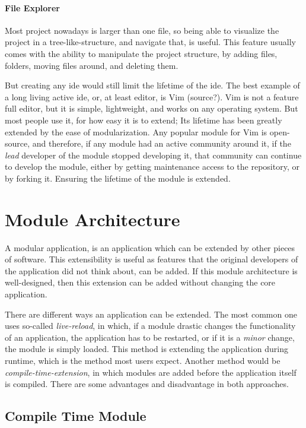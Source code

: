 \paragraph{File Explorer} Most project nowadays is larger than one file, so
being able to visualize the project in a tree-like-structure, and navigate that,
is useful. This feature usually comes with the ability to manipulate the project
structure, by adding files, folders, moving files around, and deleting them.

But creating any \gls{ide} would still limit the lifetime of the \gls{ide}.
The best example of a long living active \gls{ide}, or, at least editor, is Vim
(source?). Vim is not a feature full editor, but it is simple, lightweight, and
works on any operating system. But most people use it, for how easy it is to
extend; Its lifetime has been greatly extended by the ease of modularization.
Any popular module for Vim is open-source, and therefore, if any module had an
active community around it, if the \textit{lead} developer of the module stopped
developing it, that community can continue to develop the module, either by
getting maintenance access to the repository, or by forking it. Ensuring the
lifetime of the module is extended.

\section{Module Architecture}


A modular application, is an application which can be extended by other pieces
of software. This extensibility is useful as features that the original
developers of the application did not think about, can be added. If this module
architecture is well-designed, then this extension can be added without changing
the core application.

There are different ways an application can be extended. The most common one
uses so-called \textit{live-reload}, in which, if a module drastic changes the
functionality of an application, the application has to be restarted, or if it
is a \textit{minor} change, the module is simply loaded. This method is
extending the application during runtime, which is the method most users
expect. Another method would be \textit{compile-time-extension}, in which
modules are added before the application itself is compiled. There are some
advantages and disadvantage in both approaches.

\subsection{Compile Time Module}

